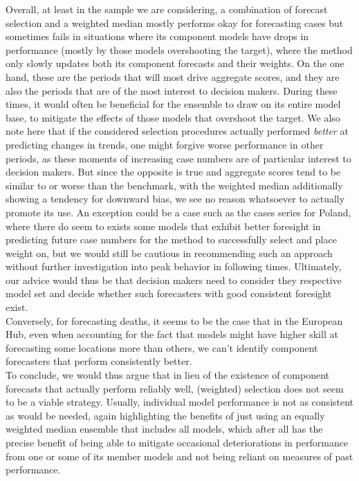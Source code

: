 Overall, at least in the sample we are considering, a combination of forecast selection and a weighted median mostly performs okay for forecasting cases but sometimes fails in situations where its component models have drops in performance (mostly by those models overshooting the target), where the method only slowly updates both its component forecasts and their weights. On the one hand, these are the periods that will most drive aggregate scores, and they are also the periods that are of the most interest to decision makers. During these times, it would often be beneficial for the ensemble to draw on its entire model base, to mitigate the effects of those models that overshoot the target. We also note here that if the considered selection procedures actually performed \textit{better} at predicting changes in trends, one might forgive worse performance in other periods, as these moments of increasing case numbers are of particular interest to decision makers. But since the opposite is true and aggregate scores tend to be similar to or worse than the benchmark, with the weighted median additionally showing a tendency for downward bias, we see no reason whatsoever to actually promote its use. An exception could be a case such as the cases series for Poland, where there do seem to exists some models that exhibit better foresight in predicting future case numbers for the method to successfully select and place weight on, but we would still be cautious in recommending such an approach without further investigation into peak behavior in following times. Ultimately, our advice would thus be that decision makers need to consider they respective model set and decide whether such forecasters with good consistent foresight exist.\\ 
Conversely, for forecasting deaths, it seems to be the case that in the European Hub, even when accounting for the fact that models might have higher skill at forecasting some locations more than others, we can't identify component forecasters that perform consistently better.\medskip\\ 
To conclude, we would thus argue that in lieu of the existence of component forecasts that actually perform reliably well, (weighted) selection does not seem to be a viable strategy. Usually, individual model performance is not as consistent as would be needed, again highlighting the benefits of just using an equally weighted median ensemble that includes all models, which after all has the precise benefit of being able to mitigate occasional deteriorations in performance from one or some of its member models and not being reliant on measures of past performance.\\
